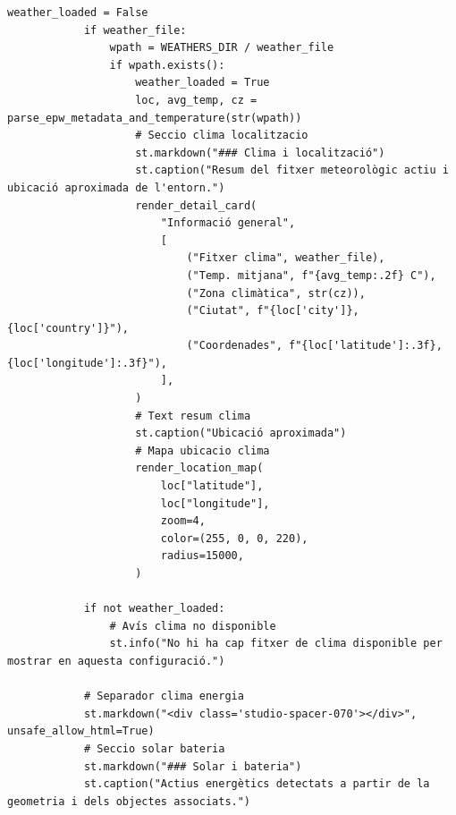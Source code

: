 \documentclass[10pt,a4paper]{article}
\begin{document}
\begin{lstlisting}[style=studioPython,caption={pages/Mostrar\_Entorn.py},label={lst:pages-mostrar-entorn-py}]
            weather_loaded = False
            if weather_file:
                wpath = WEATHERS_DIR / weather_file
                if wpath.exists():
                    weather_loaded = True
                    loc, avg_temp, cz = parse_epw_metadata_and_temperature(str(wpath))
                    # Seccio clima localitzacio
                    st.markdown("### Clima i localització")
                    st.caption("Resum del fitxer meteorològic actiu i ubicació aproximada de l'entorn.")
                    render_detail_card(
                        "Informació general",
                        [
                            ("Fitxer clima", weather_file),
                            ("Temp. mitjana", f"{avg_temp:.2f} C"),
                            ("Zona climàtica", str(cz)),
                            ("Ciutat", f"{loc['city']}, {loc['country']}"),
                            ("Coordenades", f"{loc['latitude']:.3f}, {loc['longitude']:.3f}"),
                        ],
                    )
                    # Text resum clima
                    st.caption("Ubicació aproximada")
                    # Mapa ubicacio clima
                    render_location_map(
                        loc["latitude"],
                        loc["longitude"],
                        zoom=4,
                        color=(255, 0, 0, 220),
                        radius=15000,
                    )

            if not weather_loaded:
                # Avís clima no disponible
                st.info("No hi ha cap fitxer de clima disponible per mostrar en aquesta configuració.")

            # Separador clima energia
            st.markdown("<div class='studio-spacer-070'></div>", unsafe_allow_html=True)
            # Seccio solar bateria
            st.markdown("### Solar i bateria")
            st.caption("Actius energètics detectats a partir de la geometria i dels objectes associats.")


\end{lstlisting}
\end{document}
